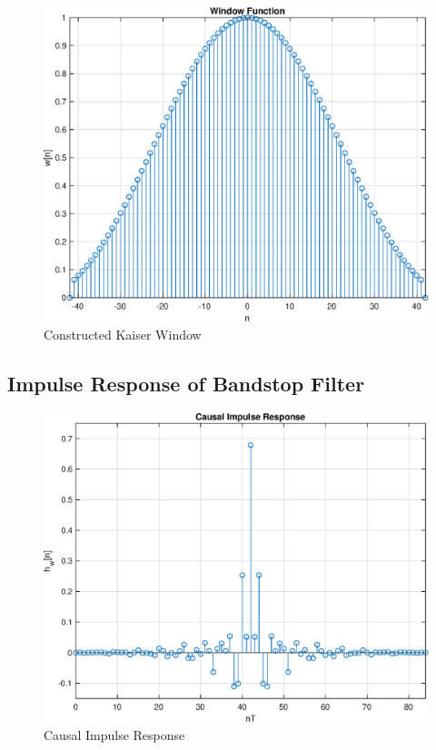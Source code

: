 \documentclass[11pt]{article}
\begin{document}
\begin{figure}[H]
    \centering
    \includegraphics[scale=0.6]{kaiser.eps} 
    \caption{Constructed Kaiser Window}
    \label{fig:kaiser}
\end{figure}

\subsection{Impulse Response of Bandstop Filter}
\begin{figure}[H]
    \centering
    \includegraphics[scale=0.6]{cir.eps} 
    \caption{Causal Impulse Response}
    \label{fig:kaiser}
\end{figure}
\end{document}
